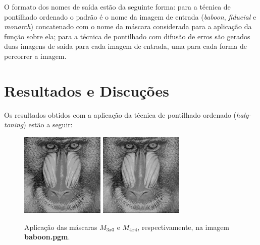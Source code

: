 \documentclass[twoside,twocolumn]{article}
\begin{document}
O formato dos nomes de saída estão da seguinte forma: para a técnica de pontilhado ordenado o padrão é o nome da imagem de entrada (\textit{baboon}, \textit{fiducial} e \textit{monarch}) concatenado com o nome da máscara considerada para a aplicação da função sobre ela; para a técnica de pontilhado com difusão de erros são gerados duas imagens de saída para cada imagem de entrada, uma para cada forma de percorrer a imagem.


\section{Resultados e Discuções}

Os resultados obtidos com a aplicação da técnica de pontilhado ordenado (\textit{halg-toning}) estão a seguir:

\begin{figure}[H]
\begin{center}
	\includegraphics[height=4cm]{figures/baboon_m33.png}
	\includegraphics[height=4cm]{figures/baboon_m44.png}
\caption{Aplicação das máscaras $M_{3x3}$ e $M_{4x4}$, respectivamente, na imagem \textbf{baboon.pgm}.} \label{baboonm33m44}
\end{center}
\end{figure}
\end{document}

